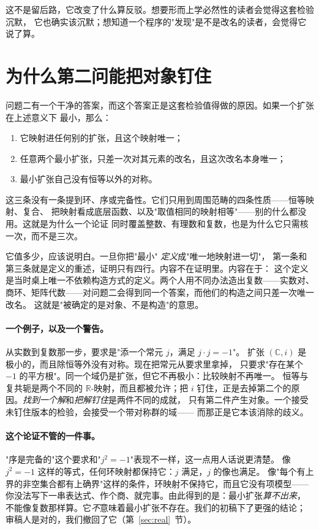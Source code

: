 \documentclass[aps,prd,preprint,superscriptaddress,amsmath,amssymb]{revtex4-2}
\begin{document}
这不是留后路，它改变了什么算反驳。想要形而上学必然性的读者会觉得这套检验沉默，
它也确实该沉默；想知道一个程序的"发现"是不是改名的读者，会觉得它说了算。

\section{为什么第二问能把对象钉住}
\label{sec:theorem}

问题二有一个干净的答案，而这个答案正是这套检验值得做的原因。如果一个扩张在上述意义下
最小，那么：

\begin{enumerate}
\item 它映射进任何别的扩张，且这个映射唯一；
\item 任意两个最小扩张，只差一次对其元素的改名，且这次改名本身唯一；
\item 最小扩张自己没有恒等以外的对称。
\end{enumerate}

这三条没有一条提到环、序或完备性。它们只用到周围范畴的四条性质——恒等映射、复合、
把映射看成底层函数、以及"取值相同的映射相等"——别的什么都没用。这就是为什么一个论证
同时覆盖整数、有理数和复数，也是为什么它只需核一次，而不是三次。

它值多少，应该说明白。一旦你把"最小" \emph{定义}成"唯一地映射进一切"，
第一条和第三条就是定义的重述，证明只有四行。内容不在证明里。内容在于：
这个定义是当时桌上唯一不依赖构造方式的定义。两个人用不同办法造出复数——实数对、
商环、矩阵代数——对问题二会得到同一个答案，而他们的构造之间只差一次唯一改名。
这就是"被确定的是对象、不是构造"的意思。

\paragraph{一个例子，以及一个警告。}
从实数到复数那一步，要求是"添一个常元 $j$，满足 $j\cdot j=-1$"。
扩张 $(\mathbb{C},i)$ 是极小的，而且除恒等外没有对称。现在把常元从要求里拿掉，
只要求"存在某个 $-1$ 的平方根"。同一个域仍是扩张，但它不再极小：比较映射不再唯一。
恒等与复共轭是两个不同的 $\mathbb{R}$-映射，而且都被允许；把 $i$ 钉住，正是去掉第二个的原因。\emph{找到一个解}和\emph{把解钉住}是两件不同的成就，
只有第二件产生对象。一个接受未钉住版本的检验，会接受一个带对称群的域——
而那正是它本该消除的歧义。

\paragraph{这个论证不管的一件事。}
"序是完备的"这个要求和"$j^2=-1$"表现不一样，这一点用人话说更清楚。
像 $j^2=-1$ 这样的等式，任何环映射都保持它：$j$ 满足，$j$ 的像也满足。
像"每个有上界的非空集合都有上确界"这样的条件，环映射不保持它，而且它没有项模型——
你没法写下一串表达式、作个商、就完事。由此得到的是：最小扩张\emph{算不出来}，
不能像复数那样算。它\emph{不}意味着最小扩张不存在。我们的初稿下了更强的结论；
审稿人是对的，我们撤回了它（第~\ref{sec:real}~节）。
\end{document}
